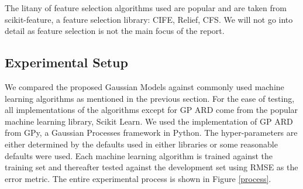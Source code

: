 \documentclass{article}
\begin{document}
	The litany of feature selection algorithms used are popular and are taken from scikit-feature, a feature selection library\cite{li2016feature}: CIFE\cite{Lin2006}, Relief\cite{Rob2003}, CFS\cite{HALLHALL}. We will not go into detail as feature selection is not the main focus of the report.
	
	\subsection{Experimental Setup}
	We compared the proposed Gaussian Models against commonly used machine learning algorithms as mentioned in the previous section. For the ease of testing, all implementations of the algorithms except for GP ARD come from the popular machine learning library, Scikit Learn\cite{scikit-learn}. We used the 
	implementation of GP ARD from GPy, a Gaussian Processes framework in Python\cite{gpy2014}.
	The hyper-parameters are either determined by the defaults used in either libraries or some reasonable defaults were used.
	Each machine learning algorithm is trained against the training set and thereafter tested against the development set using RMSE as the error metric. 
	The entire experimental process is shown in Figure \ref{process}.
 

 	
\end{document}
